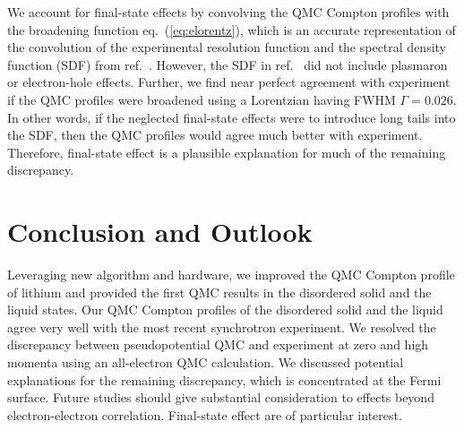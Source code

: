 \documentclass[aps,prb,showpacs,preprintnumbers,amsmath,amssymb,superscriptaddress,twocolumn]{revtex4-1}
\begin{document}
We account for final-state effects by convolving the QMC Compton profiles with the broadening function eq.~(\ref{eq:elorentz}), which is an accurate representation of the convolution of the experimental resolution function and the spectral density function (SDF) from ref.~\cite{Soininen2001}. However, the SDF in ref.~\cite{Soininen2001} did not include plasmaron or electron-hole effects. Further, we find near perfect agreement with experiment if the QMC profiles were broadened using a Lorentzian having FWHM $\Gamma=0.026$. In other words, if the neglected final-state effects were to introduce long tails into the SDF, then the QMC profiles would agree much better with experiment. Therefore, final-state effect is a plausible explanation for much of the remaining discrepancy.




\section{Conclusion and Outlook}

Leveraging new algorithm and hardware, we improved the QMC Compton profile of lithium and provided the first QMC results in the disordered solid and the liquid states. Our QMC Compton profiles of the disordered solid and the liquid agree very well with the most recent synchrotron experiment. We resolved the discrepancy between pseudopotential QMC and experiment at zero and high momenta using an all-electron QMC calculation. We discussed potential explanations for the remaining discrepancy, which is concentrated at the Fermi surface. Future studies should give substantial consideration to effects beyond electron-electron correlation. Final-state effect are of particular interest.
\end{document}

